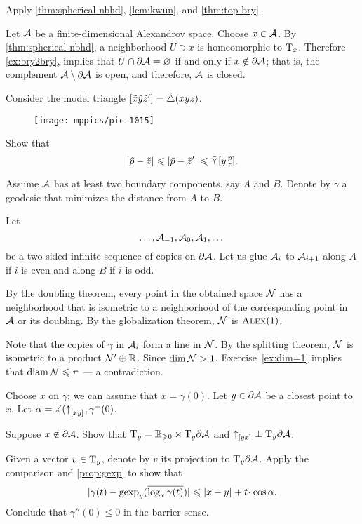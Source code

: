  Apply \ref{thm:spherical-nbhd}, \ref{lem:kwun}, and \ref{thm:top-bry}.

Let $\mathcal{A}$ be a finite-dimensional Alexandrov space.
Choose $x\in\mathcal{A}$.
By \ref{thm:spherical-nbhd}, a neighborhood $U\ni x$ is homeomorphic to $\mathrm{T}_x$.
Therefore \ref{ex:bry2bry}, implies that $U\cap\partial\mathcal{A}=\varnothing$ if and only if $x\notin \partial\mathcal{A}$;
that is, the complement $\mathcal{A}\setminus\partial\mathcal{A}$ is open, and therefore, $\mathcal{A}$ is closed.

Consider the model triangle $[\tilde x\tilde y\tilde z']=\tilde\triangle(xyz)$.
\begin{figure}[ht!]
\vskip-0mm
\centering
\texttt{[image: mppics/pic-1015]}
\end{figure}

Show that 
\[|{\tilde p}-{\tilde z}|_{}^{{}}\leqslant |{\tilde p}-{\tilde z'}|_{}^{{}}\leqslant\mathop{\tilde\curlyvee}\nolimits[y\,{}^{p}_{z}].\]


Assume $\mathcal{A}$ has at least two boundary components, say $A$ and $B$.
Denote by $\gamma$ a geodesic that minimizes the distance from $A$ to $B$.

Let 
\[\dots,\mathcal{A}_{-1},\mathcal{A}_{0},\mathcal{A}_{1},\dots\]
be a two-sided infinite sequence of copies on $\partial\mathcal{A}$.
Let us glue $\mathcal{A}_{i}$ to $\mathcal{A}_{i+1}$ along $A$ if $i$ is even and along $B$ if $i$ is odd.

By the doubling theorem, every point in the obtained space $\mathcal{N}$ has a neighborhood that is isometric to a neighborhood of the corresponding point in $\mathcal{A}$ or its doubling.
By the globalization theorem, $\mathcal{N}$ is $\textsc{Alex}(1)$.

Note that the copies of $\gamma$ in $\mathcal{A}_{i}$ form a line in $\mathcal{N}$.
By the splitting theorem, $\mathcal{N}$ is isometric to a product $\mathcal{N}'\oplus \mathbb{R}$.
Since $\operatorname{\rm dim}\nolimits\mathcal{N}>1$, Exercise~\ref{ex:dim=1} implies that $\operatorname{\rm diam}\nolimits\mathcal{N}\leqslant \pi$ --- a contradiction.

 Choose $x$ on $\gamma$;
we can assume that $x=\gamma(0)$.
Let $y\in \partial \mathcal{A}$ be a closest point to $x$.
Let $\alpha=\measuredangle({\uparrow}_{[{x}{y}]_{{}}},\gamma^+(0)$.

Suppose $x\notin \partial \mathcal{A}$.
Show that $\mathrm{T}_y=\mathbb{R}_{\geqslant0}\times\mathrm{T}_y\partial \mathcal{A}$
and ${\uparrow}_{[{y}{x}]_{{}}}\perp \mathrm{T}_y\partial \mathcal{A}$.

Given a vector $v\in \mathrm{T}_y$, denote by $\bar v$ its projection to $\mathrm{T}_y\partial \mathcal{A}$.
Apply the comparison and \ref{prop:gexp} to show that 
\[\dist{\gamma(t)}{\gexp_y(\overline{\log_x\gamma(t)})}{}\le \dist{x}{y}{}+t\cdot\cos\alpha.\]
Conclude that $\gamma''(0)\le 0$ in the barrier sense.


